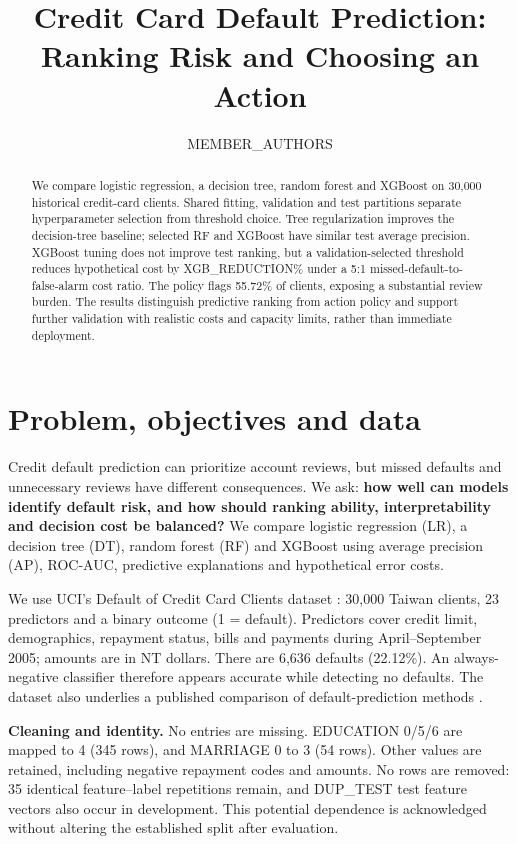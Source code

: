 \documentclass{article}
\title{Credit Card Default Prediction:\\Ranking Risk and Choosing an Action}
\author{ {{MEMBER_AUTHORS}} }
\begin{document}
\maketitle
\thispagestyle{plain}
\begin{abstract}
We compare logistic regression, a decision tree, random forest and XGBoost on 30,000 historical credit-card clients. Shared fitting, validation and test partitions separate hyperparameter selection from threshold choice. Tree regularization improves the decision-tree baseline; selected RF and XGBoost have similar test average precision. XGBoost tuning does not improve test ranking, but a validation-selected threshold reduces hypothetical cost by {{XGB_REDUCTION}}\% under a 5:1 missed-default-to-false-alarm cost ratio. The policy flags 55.72\% of clients, exposing a substantial review burden. The results distinguish predictive ranking from action policy and support further validation with realistic costs and capacity limits, rather than immediate deployment.
\end{abstract}
\section{Problem, objectives and data}
Credit default prediction can prioritize account reviews, but missed defaults and unnecessary reviews have different consequences. We ask: \textbf{how well can models identify default risk, and how should ranking ability, interpretability and decision cost be balanced?} We compare logistic regression (LR), a decision tree (DT), random forest (RF) and XGBoost using average precision (AP), ROC-AUC, predictive explanations and hypothetical error costs.

We use UCI's Default of Credit Card Clients dataset \citep{uci}: 30,000 Taiwan clients, 23 predictors and a binary outcome (1 = default). Predictors cover credit limit, demographics, repayment status, bills and payments during April--September 2005; amounts are in NT dollars. There are 6,636 defaults (22.12\%). An always-negative classifier therefore appears accurate while detecting no defaults. The dataset also underlies a published comparison of default-prediction methods \citep{yeh}.

\textbf{Cleaning and identity.} No entries are missing. EDUCATION 0/5/6 are mapped to 4 (345 rows), and MARRIAGE 0 to 3 (54 rows). Other values are retained, including negative repayment codes and amounts. No rows are removed: 35 identical feature--label repetitions remain, and {{DUP_TEST}} test feature vectors also occur in development. This potential dependence is acknowledged without altering the established split after evaluation.
\end{document}
